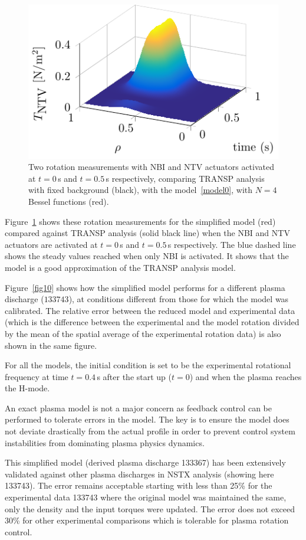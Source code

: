 \documentclass{iopart}
\begin{document}
\begin{figure}
\centering
\includegraphics{imene_figs/fig8} %
\caption{Two rotation measurements with NBI and NTV actuators activated at $t=0$\,s and $t=0.5$\,s respectively, comparing TRANSP analysis with fixed background (black), with the model~\eqref{model0}, with $N=4$ Bessel functions (red).}
\label{Goum12}
\end{figure}

Figure~\ref{Goum12} shows these rotation measurements for the simplified model (red) compared against TRANSP analysis (solid black line) when the NBI and NTV actuators are activated at $t=0$\,s and $t=0.5$\,s respectively. The blue dashed line shows the steady values reached when only NBI is activated. It shows that the model is a good approximation of the TRANSP analysis model.


Figure~\ref{fig10} shows how the simplified model performs for a different plasma discharge ($133743$), at conditions different from those for which the model was calibrated.  The relative error between the reduced model and experimental data (which is the difference between the experimental and the model rotation divided by the mean of the spatial average of the experimental rotation data) is also shown in  the same figure.

For all the models, the initial condition is set to be the experimental rotational frequency at  time $t=0.4$\,s after the start up ($t=0$) and when the plasma reaches the H-mode.

An exact plasma model is not a major concern as feedback control can be performed to tolerate errors in the model. The key is to ensure the model does not deviate drastically from the actual profile in order to prevent control system instabilities from dominating plasma physics dynamics.

This simplified model (derived plasma discharge 133367) has been extensively validated against other plasma discharges in NSTX analysis (showing here 133743). The error remains acceptable starting with less than 25\% for the  experimental data 133743 where the original model was maintained the same, only the density and the input torques were updated. The error does not exceed 30\% for other experimental comparisons which is tolerable for plasma rotation control.
\end{document}
